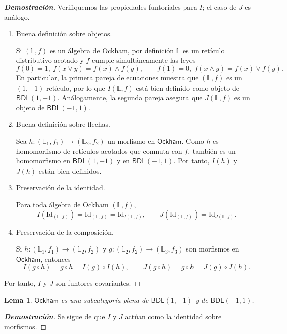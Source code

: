 \documentclass[12pt]{book}
\newtheorem{lemma}[theorem]{Lema}
\newcommand{\Id}{\mathrm{Id}}
\newcommand{\BDL}{\mathsf{BDL}}
\newcommand{\Ock}{\mathsf{Ockham}}
\begin{document}
\begin{proof}[\textbf{Demostración}]
Verifiquemos las propiedades funtoriales para $I$; el caso de $J$ es análogo.

\begin{enumerate}
  \item Buena definición sobre objetos.
  
  Si $(\mathbb{L},f)$ es un álgebra de Ockham, por definición $\mathbb{L}$ es un retículo distributivo acotado y $f$ cumple simultáneamente las leyes
  \[
  f(0)=1,\ f(x\vee y)=f(x)\wedge f(y),
  \qquad
  f(1)=0,\ f(x\wedge y)=f(x)\vee f(y).
  \]
  En particular, la primera pareja de ecuaciones muestra que
  $(\mathbb{L},f)$ es un $(1,-1)$-retículo, por lo que $I(\mathbb{L},f)$
  está bien definido como objeto de $\BDL(1,-1)$.
  Análogamente, la segunda pareja asegura que
  $J(\mathbb{L},f)$ es un objeto de $\BDL(-1,1)$.

  \item Buena definición sobre flechas.
  
  Sea $h\colon(\mathbb{L}_1,f_1)\to(\mathbb{L}_2,f_2)$ un morfismo en $\Ock$.
  Como $h$ es homomorfismo de retículos acotados que conmuta con $f$,
  también es un homomorfismo en $\BDL(1,-1)$ y en $\BDL(-1,1)$.
  Por tanto, $I(h)$ y $J(h)$ están bien definidos.

  \item Preservación de la identidad.
  
  Para toda álgebra de Ockham $(\mathbb{L},f)$,
  \[
  I(\Id_{(\mathbb{L},f)}) = \Id_{(\mathbb{L},f)} =
  \Id_{I(\mathbb{L},f)},
  \qquad
  J(\Id_{(\mathbb{L},f)}) = \Id_{J(\mathbb{L},f)}.
  \]

  \item Preservación de la composición.
  
  Si $h\colon(\mathbb{L}_1,f_1)\to(\mathbb{L}_2,f_2)$ y
  $g\colon(\mathbb{L}_2,f_2)\to(\mathbb{L}_3,f_3)$ son morfismos en $\Ock$,
  entonces
  \[
  I(g\circ h)=g\circ h = I(g)\circ I(h),
  \qquad
  J(g\circ h)=g\circ h = J(g)\circ J(h).
  \]
\end{enumerate}
Por tanto, $I$ y $J$ son funtores covariantes.
\end{proof}
\begin{lemma}\label{lem:Ock-plena}
$\Ock$ es una subcategoría plena de $\BDL(1,-1)$ y de $\BDL(-1,1)$.
\end{lemma}
\begin{proof}[\textbf{Demostración}]
Se sigue de que $I$ y $J$ actúan como la identidad sobre morfismos.
\end{proof}
\end{document}
